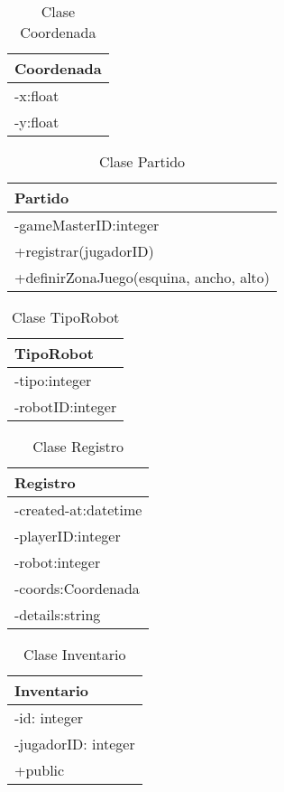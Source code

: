\documentclass{article}
\begin{document}
\begin{table}
	\centering
	\begin{tabular}{|l|}
	\hline
		Coordenada\\
	\hline
		-x:float\\
		-y:float\\
	  \hline
	\end{tabular}
	\caption{Clase Coordenada}
	\label{tab:Coordenada}
\end{table}
\begin{table}
	\centering
	\begin{tabular}{|l|}
	\hline
		Partido\\
	\hline
		-gameMasterID:integer\\
		+registrar(jugadorID)\\
		+definirZonaJuego(esquina, ancho, alto)\\
	  \hline
	\end{tabular}
	\caption{Clase Partido}
	\label{tab:Partido}
\end{table}
\begin{table}
	\centering
	\begin{tabular}{|l|}
	\hline
		TipoRobot\\
	\hline
		-tipo:integer\\
		-robotID:integer\\
	  \hline
	\end{tabular}
	\caption{Clase TipoRobot}
	\label{tab:TipoRobot}
\end{table}
\begin{table}
	\centering
	\begin{tabular}{|l|}
	\hline
		Registro\\
	\hline
		-created-at:datetime\\
		-playerID:integer\\
		-robot:integer\\
		-coords:Coordenada\\
		-details:string\\
	  \hline
	\end{tabular}
	\caption{Clase Registro}
	\label{tab:Registro}
\end{table}
\begin{table}
	\centering
	\begin{tabular}{|l|}
	\hline
		Inventario\\
	\hline
		-id: integer\\
		-jugadorID: integer\\
		+public\\
	  \hline
	\end{tabular}
	\caption{Clase Inventario}
	\label{tab:Inventario}
\end{table}
\end{document}

